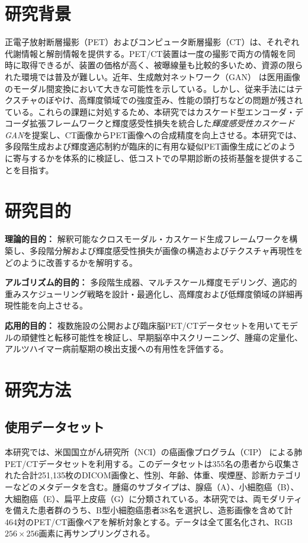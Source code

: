 \documentclass[twocolumn]{article}
\begin{document}
\section{研究背景}
正電子放射断層撮影（PET）およびコンピュータ断層撮影（CT）は、それぞれ代謝情報と解剖情報を提供する。PET/CT装置は一度の撮影で両方の情報を同時に取得できるが、装置の価格が高く、被曝線量も比較的多いため、資源の限られた環境では普及が難しい。近年、生成敵対ネットワーク（GAN）\cite{radford_unsupervised_2015} は医用画像のモーダル間変換において大きな可能性を示している。しかし、従来手法にはテクスチャのぼやけ、高輝度領域での強度歪み、性能の頭打ちなどの問題が残されている。これらの課題に対処するため、本研究ではカスケード型エンコーダ・デコーダ拡張フレームワークと輝度感受性損失を統合した\emph{輝度感受性カスケードGAN}を提案し、CT画像からPET画像への合成精度を向上させる。本研究では、多段階生成および輝度適応制約が臨床的に有用な疑似PET画像生成にどのように寄与するかを体系的に検証し、低コストでの早期診断の技術基盤を提供することを目指す。

\section{研究目的}
\textbf{理論的目的：} 解釈可能なクロスモーダル・カスケード生成フレームワークを構築し、多段階分解および輝度感受性損失が画像の構造およびテクスチャ再現性をどのように改善するかを解明する。

\textbf{アルゴリズム的目的：} 多段階生成器、マルチスケール輝度モデリング、適応的重みスケジューリング戦略を設計・最適化し、高輝度および低輝度領域の詳細再現性能を向上させる。

\textbf{応用的目的：} 複数施設の公開および臨床脳PET/CTデータセットを用いてモデルの頑健性と転移可能性を検証し、早期脳卒中スクリーニング、腫瘍の定量化、アルツハイマー病前駆期の検出支援への有用性を評価する。

\section{研究方法}
\subsection{使用データセット}
本研究では、米国国立がん研究所（NCI）の癌画像プログラム（CIP）\cite{li_large-scale_2020} による肺PET/CTデータセットを利用する。このデータセットは355名の患者から収集された合計251,135枚のDICOM画像と、性別、年齢、体重、喫煙歴、診断カテゴリーなどのメタデータを含む。腫瘍のサブタイプは、腺癌（A）、小細胞癌（B）、大細胞癌（E）、扁平上皮癌（G）に分類されている。本研究では、両モダリティを備えた患者群のうち、B型小細胞癌患者38名を選択し、造影画像を含めて計464対のPET/CT画像ペアを解析対象とする。データは全て匿名化され、RGB $256\times256$画素に再サンプリングされる。
\end{document}
